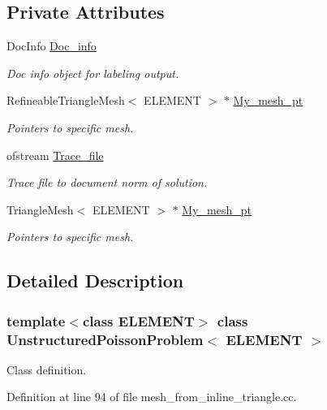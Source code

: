 \subsection*{Private Attributes}
\begin{DoxyCompactItemize}
\item 
Doc\+Info \hyperlink{classUnstructuredPoissonProblem_a5c4c29b1c95cd63055e5aced124ca708}{Doc\+\_\+info}
\begin{DoxyCompactList}\small\item\em Doc info object for labeling output. \end{DoxyCompactList}\item 
Refineable\+Triangle\+Mesh$<$ E\+L\+E\+M\+E\+NT $>$ $\ast$ \hyperlink{classUnstructuredPoissonProblem_af95c713f5db16c288e307768b6bf9bb8}{My\+\_\+mesh\+\_\+pt}
\begin{DoxyCompactList}\small\item\em Pointers to specific mesh. \end{DoxyCompactList}\item 
ofstream \hyperlink{classUnstructuredPoissonProblem_ac7fdb8fb9a886ced0ee7244890406d90}{Trace\+\_\+file}
\begin{DoxyCompactList}\small\item\em Trace file to document norm of solution. \end{DoxyCompactList}\item 
Triangle\+Mesh$<$ E\+L\+E\+M\+E\+NT $>$ $\ast$ \hyperlink{classUnstructuredPoissonProblem_a138fcf0adb978a7f3ae9e27ba6df900b}{My\+\_\+mesh\+\_\+pt}
\begin{DoxyCompactList}\small\item\em Pointers to specific mesh. \end{DoxyCompactList}\end{DoxyCompactItemize}


\subsection{Detailed Description}
\subsubsection*{template$<$class E\+L\+E\+M\+E\+NT$>$\newline
class Unstructured\+Poisson\+Problem$<$ E\+L\+E\+M\+E\+N\+T $>$}

Class definition. 

Definition at line 94 of file mesh\+\_\+from\+\_\+inline\+\_\+triangle.\+cc.



